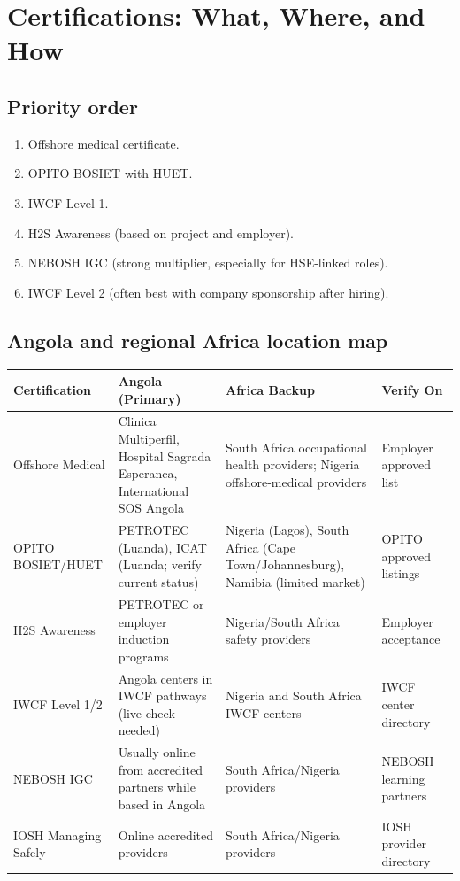 \documentclass[11pt,openany]{book}
\begin{document}
\chapter{Certifications: What, Where, and How}

\section{Priority order}
\begin{enumerate}
  \item Offshore medical certificate.
  \item OPITO BOSIET with HUET.
  \item IWCF Level 1.
  \item H2S Awareness (based on project and employer).
  \item NEBOSH IGC (strong multiplier, especially for HSE-linked roles).
  \item IWCF Level 2 (often best with company sponsorship after hiring).
\end{enumerate}

\section{Angola and regional Africa location map}
\begingroup
\footnotesize
\setlength{\tabcolsep}{4pt}
\begin{longtable}{>{\raggedright\arraybackslash}p{} >{\raggedright\arraybackslash}p{} >{\raggedright\arraybackslash}p{} >{\raggedright\arraybackslash}p{}}
\toprule
\rowcolor{DeepSea!14}
\textbf{Certification} & \textbf{Angola (Primary)} & \textbf{Africa Backup} & \textbf{Verify On} \\
\midrule
Offshore Medical & Clinica Multiperfil, Hospital Sagrada Esperanca, International SOS Angola & South Africa occupational health providers; Nigeria offshore-medical providers & Employer approved list \\
OPITO BOSIET/HUET & PETROTEC (Luanda), ICAT (Luanda; verify current status) & Nigeria (Lagos), South Africa (Cape Town/Johannesburg), Namibia (limited market) & OPITO approved listings \\
H2S Awareness & PETROTEC or employer induction programs & Nigeria/South Africa safety providers & Employer acceptance \\
IWCF Level 1/2 & Angola centers in IWCF pathways (live check needed) & Nigeria and South Africa IWCF centers & IWCF center directory \\
NEBOSH IGC & Usually online from accredited partners while based in Angola & South Africa/Nigeria providers & NEBOSH learning partners \\
IOSH Managing Safely & Online accredited providers & South Africa/Nigeria providers & IOSH provider directory \\
\bottomrule
\end{longtable}
\endgroup
\end{document}
